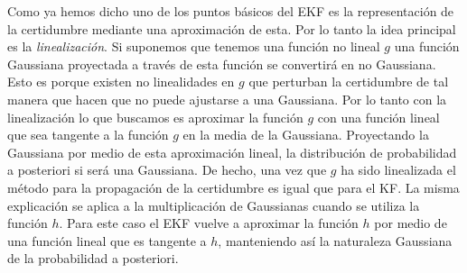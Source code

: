 Como ya hemos dicho uno de los puntos básicos del \ac{EKF} es la representación de la certidumbre mediante una aproximación de esta.
Por lo tanto la idea principal es la \textit{linealización}.
Si suponemos que tenemos una función no lineal $g$ una función Gaussiana proyectada a través de esta función se convertirá en no Gaussiana.
Esto es porque existen no linealidades en $g$ que perturban la certidumbre de tal manera que hacen que no puede ajustarse a una Gaussiana.
Por lo tanto con la linealización lo que buscamos es aproximar la función $g$ con una función lineal que sea tangente a la función $g$ en la media de la Gaussiana.
Proyectando la Gaussiana por medio de esta aproximación lineal, la distribución de probabilidad a posteriori si será una Gaussiana.
%
%
%
De hecho, una vez que $g$ ha sido linealizada el método para la propagación de la certidumbre es igual que para el \ac{KF}.
La misma explicación se aplica a la multiplicación de Gaussianas cuando se utiliza la función $h$.
Para este caso el \ac{EKF} vuelve a aproximar la función $h$ por medio de una función lineal que es tangente a $h$, manteniendo así la naturaleza Gaussiana de la probabilidad a posteriori.

